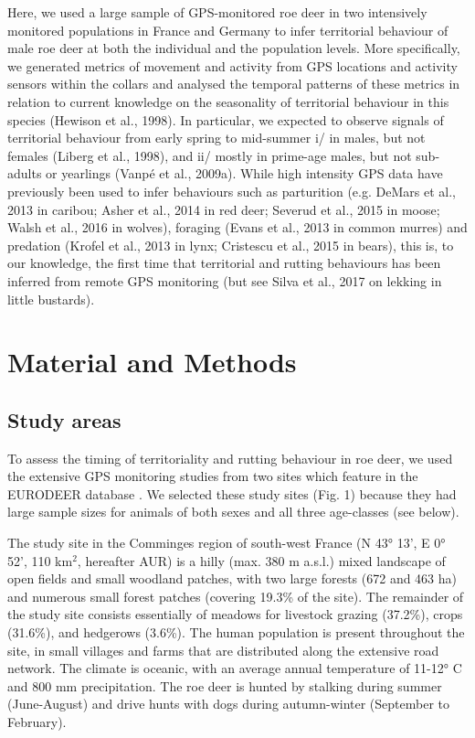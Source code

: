 \documentclass[a4paper,11pt]{article}
\begin{document}
Here, we used a large sample of GPS-monitored roe deer in two
intensively monitored populations in France and Germany to infer
territorial behaviour of male roe deer at both the individual and the
population levels. More specifically, we generated metrics of movement
and activity from GPS locations and activity sensors within the
collars and analysed the temporal patterns of these metrics in
relation to current knowledge on the seasonality of territorial
behaviour in this species (Hewison et al., 1998). In particular, we
expected to observe signals of territorial behaviour from early spring
to mid-summer i/ in males, but not females (Liberg et al., 1998), and
ii/ mostly in prime-age males, but not sub-adults or yearlings (Vanpé
et al., 2009a). While high intensity GPS data have previously been
used to infer behaviours such as parturition (e.g. DeMars et al., 2013
in caribou; Asher et al., 2014 in red deer; Severud et al., 2015 in
moose; Walsh et al., 2016 in wolves), foraging (Evans et al., 2013 in
common murres) and predation (Krofel et al., 2013 in lynx; Cristescu
et al., 2015 in bears), this is, to our knowledge, the first time that
territorial and rutting behaviours has been inferred from remote GPS
monitoring (but see Silva et al., 2017 on lekking in little bustards).

\section*{Material and Methods}
\subsection*{Study areas}

To assess the timing of territoriality and rutting behaviour in roe
deer, we used the extensive GPS monitoring studies from two sites
which feature in the EURODEER database \citep{cagnacci_partial_2011}. We
selected these study sites (Fig. 1) because they had large sample
sizes for animals of both sexes and all three age-classes (see below).

The study site in the Comminges region of south-west France (N 43° 13',
E 0° 52', 110 km$^2$, hereafter AUR) is a hilly (max. 380 m a.s.l.) mixed
landscape of open fields and small woodland patches, with two large
forests (672 and 463 ha) and numerous small forest patches (covering
19.3\% of the site). The remainder of the study site consists
essentially of meadows for livestock grazing (37.2\%), crops (31.6\%),
and hedgerows (3.6\%). The human population is present throughout the
site, in small villages and farms that are distributed along the
extensive road network. The climate is oceanic, with an average annual
temperature of 11-12° C and 800 mm precipitation. The roe deer is
hunted by stalking during summer (June-August) and drive hunts with
dogs during autumn-winter (September to February).
\end{document}
